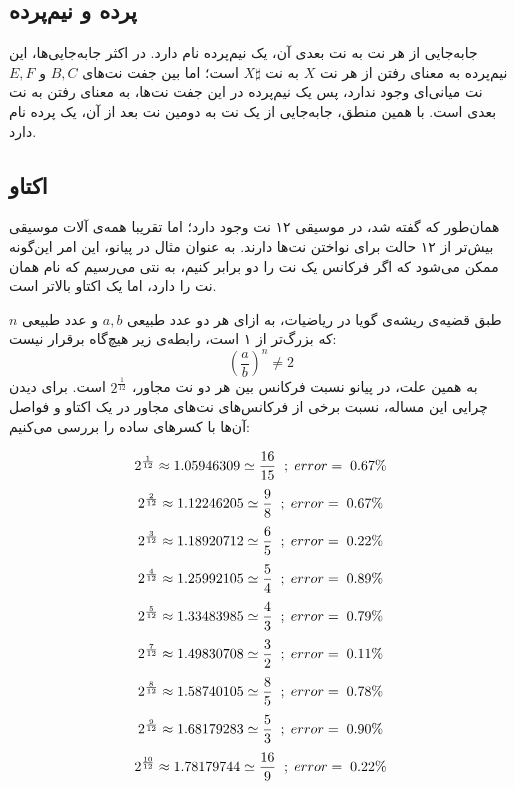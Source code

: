 \subsection{پرده و نیم‌پرده}
جابه‌جایی از هر نت به نت بعدی آن، یک نیم‌پرده
نام دارد. در اکثر جابه‌جایی‌ها، این نیم‌پرده به معنای رفتن از هر نت
$X$
به نت
$X\sharp$
است؛ اما بین جفت نت‌های
$B, C$
و
$E, F$
نت میانی‌ای وجود ندارد، پس یک نیم‌پرده در این جفت نت‌ها، به معنای رفتن به نت بعدی است.
با همین منطق، جابه‌جایی از یک نت به دومین نت بعد از آن، یک پرده
نام دارد.

\subsection{اکتاو}
همان‌طور که گفته شد، در موسیقی ۱۲ نت وجود دارد؛ اما تقریبا همه‌ی آلات موسیقی بیش‌تر از ۱۲ حالت برای نواختن نت‌ها دارند. به عنوان مثال در پیانو، این امر این‌گونه ممکن می‌شود که اگر فرکانس یک نت را دو برابر کنیم، به نتی می‌رسیم که نام همان نت را دارد، اما یک اکتاو
بالاتر است.

طبق قضیه‌ی ریشه‌ی گویا
در ریاضیات، به ازای هر دو عدد طبیعی 
$a, b$
و عدد طبیعی
$n$
که بزرگ‌تر از ۱ است، رابطه‌ی زیر هیچ‌گاه برقرار نیست:
\begin{equation}
    (\frac{a}{b})^n \neq 2
\end{equation}
به همین علت، در پیانو نسبت فرکانس بین هر دو نت مجاور، 
$2^{\frac{1}{12}}$
است.
برای دیدن چرایی این مساله، نسبت برخی از فرکانس‌های نت‌های مجاور در یک اکتاو و فواصل آن‌ها با کسرهای ساده را بررسی می‌کنیم:

\begin{equation}
\begin{gathered}
    2^{\frac{1}{12}} \approx 1.05946309 \simeq \frac{16}{15} \hspace{2mm} ; \hspace{1mm} error = \hspace{1mm} 0.67\% \\[3pt]
    2^{\frac{2}{12}} \approx 1.12246205 \simeq \frac{9}{8} \hspace{2mm} ; \hspace{1mm} error = \hspace{1mm} 0.67\% \\[3pt]
    2^{\frac{3}{12}} \approx 1.18920712 \simeq \frac{6}{5} \hspace{2mm} ; \hspace{1mm} error = \hspace{1mm} 0.22\% \\[3pt]
    2^{\frac{4}{12}} \approx 1.25992105 \simeq \frac{5}{4} \hspace{2mm} ; \hspace{1mm} error = \hspace{1mm} 0.89\% \\[3pt]
    2^{\frac{5}{12}} \approx 1.33483985 \simeq \frac{4}{3} \hspace{2mm} ; \hspace{1mm} error = \hspace{1mm} 0.79\% \\[3pt]
    2^{\frac{7}{12}} \approx 1.49830708 \simeq \frac{3}{2} \hspace{2mm} ; \hspace{1mm} error = \hspace{1mm} 0.11\% \\[3pt]
    2^{\frac{8}{12}} \approx 1.58740105 \simeq \frac{8}{5} \hspace{2mm} ; \hspace{1mm} error = \hspace{1mm} 0.78\% \\[3pt]
    2^{\frac{9}{12}} \approx 1.68179283 \simeq \frac{5}{3} \hspace{2mm} ; \hspace{1mm} error = \hspace{1mm} 0.90\% \\[3pt]
    2^{\frac{10}{12}} \approx 1.78179744 \simeq \frac{16}{9} \hspace{2mm} ; \hspace{1mm} error = \hspace{1mm} 0.22\% \\[3pt]
\end{gathered}    
\end{equation}

